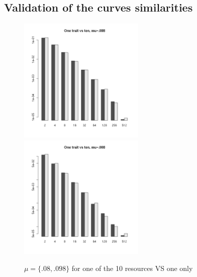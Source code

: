 \documentclass[a4paper]{article}
\begin{document}
\subsection{Validation of the curves similarities}
\begin{figure}[h]
	\begin{center}
		\includegraphics[width=6cm]{img/OneVsTenMu098.png}
		\includegraphics[width=6cm]{img/OneVsTenMu008.png}
	\end{center}
	\caption{$\mu=\{.08,.098\}$ for one of the 10 resources VS one only}
	\label{fig:OneVsTen}
\end{figure}

  
\end{document}
